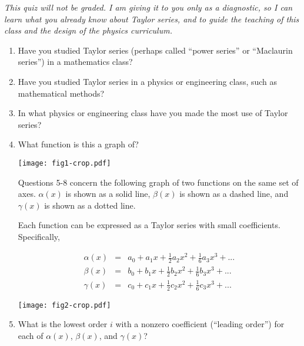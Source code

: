 \documentclass[12pt]{article}
\begin{document}
\begin{center}
\Large{}

\normalsize\it
This quiz will not be graded. I am giving it to you only as a diagnostic, so I can learn what you already know about Taylor series, and to guide the teaching of this class and the design of the physics curriculum. 
\end{center}



\begin{enumerate}

\item{Have you studied Taylor series (perhaps called ``power series'' or ``Maclaurin series'') in a mathematics class?}
\vspace{1in}

\item{Have you studied Taylor series in a physics or engineering class, such as mathematical methods?}
\vspace{1in}

\item{In what physics or engineering class have you made the most use of Taylor series?}
\vspace{1in}

\item{What function is this a graph of?}

\texttt{[image: fig1-crop.pdf]}

\vspace{1in}

Questions 5-8 concern the following graph of two functions on the same set of axes. $\alpha(x)$ is shown as a solid line, $\beta(x)$ is shown as a dashed line, and $\gamma(x)$ is shown as a dotted line.

Each function can be expressed as a Taylor series with small coefficients. Specifically, 

\begin{align*}
\alpha(x) &=& a_0 + a_1 x + \frac{1}{2} a_2 x^2 + \frac{1}{6} a_3 x^3 + ...\\ 
\beta(x) &=& b_0 + b_1 x + \frac{1}{2} b_2 x^2 + \frac{1}{6} b_3 x^3 + ...\\
\gamma(x) &=& c_0 + c_1 x + \frac{1}{2} c_2 x^2 + \frac{1}{6} c_3 x^3 + ...
\end{align*}

\texttt{[image: fig2-crop.pdf]}

\item{What is the lowest order $i$ with a nonzero coefficient (``leading order'') for each of $\alpha(x)$, $\beta(x)$, and $\gamma(x)$?}
\vspace{1in}


\end{enumerate}
\end{document}
